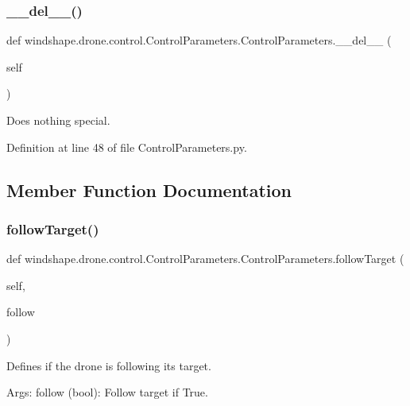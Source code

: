 \subsubsection{\texorpdfstring{\+\_\+\+\_\+del\+\_\+\+\_\+()}{\_\_del\_\_()}}
{\footnotesize\ttfamily def windshape.\+drone.\+control.\+Control\+Parameters.\+Control\+Parameters.\+\_\+\+\_\+del\+\_\+\+\_\+ (\begin{DoxyParamCaption}\item[{}]{self }\end{DoxyParamCaption})}

\begin{DoxyVerb}Does nothing special.\end{DoxyVerb}
 

Definition at line 48 of file Control\+Parameters.\+py.



\subsection{Member Function Documentation}
\mbox{\label{classwindshape_1_1drone_1_1control_1_1_control_parameters_1_1_control_parameters_a7bd1727e6faf7c0e58aaca96d064e556}} 
\subsubsection{\texorpdfstring{follow\+Target()}{followTarget()}}
{\footnotesize\ttfamily def windshape.\+drone.\+control.\+Control\+Parameters.\+Control\+Parameters.\+follow\+Target (\begin{DoxyParamCaption}\item[{}]{self,  }\item[{}]{follow }\end{DoxyParamCaption})}

\begin{DoxyVerb}Defines if the drone is following its target.

Args:
    follow (bool): Follow target if True.
\end{DoxyVerb}
 

